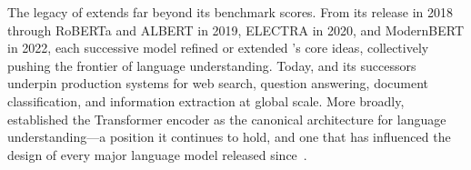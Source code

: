 The legacy of \bert{} extends far beyond its benchmark scores.  From its release in
2018 through RoBERTa and ALBERT in 2019, ELECTRA in 2020, and ModernBERT in 2022,
each successive model refined or extended \bert{}'s core ideas, collectively pushing
the frontier of language understanding.  Today, \bert{} and its successors underpin
production systems for web search, question answering, document classification, and
information extraction at global scale.  More broadly, \bert{} established the
Transformer encoder as the canonical architecture for language understanding---a
position it continues to hold, and one that has influenced the design of every major
language model released since~\cite{rogers2020primer, bender2021dangers}.
